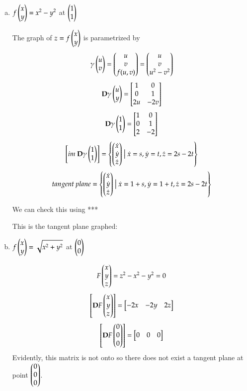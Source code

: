 \begin{enumerate}[a.]
  \item $\displaystyle f\begin{pmatrix} x \\ y \end{pmatrix} = x^2 - y^2$ at $\begin{pmatrix} 1 \\ 1 \end{pmatrix}$


  The graph of $z=f\begin{pmatrix} x \\ y \end{pmatrix}$ is parametrized by
  \[\gamma\begin{pmatrix} u \\ v \end{pmatrix}=\begin{pmatrix} u \\ v \\ f(u,v) \end{pmatrix}=\begin{pmatrix} u \\ v \\ u^2-v^2 \end{pmatrix}\]
  \[\textbf{D}\gamma\begin{pmatrix} u \\ y \end{pmatrix}=\begin{bmatrix} 1 & 0 \\ 0 & 1 \\ 2u & -2v \end{bmatrix}\]
  \[\textbf{D}\gamma\begin{pmatrix} 1 \\ 1 \end{pmatrix}=\begin{bmatrix} 1 & 0 \\ 0 & 1 \\ 2 & -2 \end{bmatrix}\]
  \[\left[im\ \bm{D}\gamma\Point{1 \\ 1}\right] = \Set{\Point{\dot{x} \\ \dot{y} \\ \dot{z}} \bigm| \dot{x} = s, \dot{y} = t, \dot{z}=2s-2t}\]
  \[tangent\ plane = \left\{ \begin{pmatrix} \dot{x} \\ \dot{y} \\ \dot{z} \end{pmatrix} \bigm| \dot{x} = 1 + s, \dot{y} = 1 + t, \dot{z}=2s-2t \right\}\]

  We can check this using ***
  
  This is the tangent plane graphed: 
  

  \item $\displaystyle f\begin{pmatrix} x \\ y \end{pmatrix} = \sqrt{x^2+y^2}$ at $\begin{pmatrix} 0 \\ 0 \end{pmatrix}$
  
  \[F\begin{pmatrix} x \\ y \\ z \end{pmatrix} = z^2 - x^2 - y^2 = 0\]
  \[\begin{bmatrix} \textbf{D}F\begin{pmatrix} x \\ y \\ z \end{pmatrix} \end{bmatrix}=\begin{bmatrix} -2x & -2y & 2z \end{bmatrix}\]
  \[\begin{bmatrix} \textbf{D}F\begin{pmatrix} 0 \\ 0 \\ 0 \end{pmatrix} \end{bmatrix}=\begin{bmatrix} 0 & 0 & 0 \end{bmatrix}\]
  Evidently, this matrix is not onto so there does not exist a tangent plane at point $\begin{pmatrix} 0 \\ 0 \\ 0 \end{pmatrix}$.


\end{enumerate}
